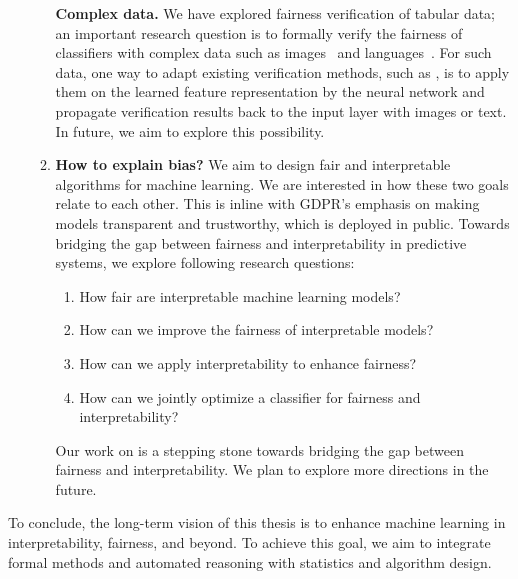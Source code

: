 \begin{itemize}
\begin{enumerate}
		
		\textbf{Complex data.} We have explored fairness verification of tabular data; an important research question is to formally verify the fairness of classifiers with complex data such as images~\cite{nuriel2021permuted} and languages~\cite{abid2021persistent,nadeem2020stereoset,vig2020investigating}. For such data, one way to adapt existing verification methods, such as {\justicia}, is to apply them on the learned feature representation by the neural network and propagate verification results back to the input layer with images or text. In future, we aim to explore this possibility.
	
		\item \textbf{How to explain bias?} We aim to design fair and interpretable algorithms for  machine learning. We are interested in how these two goals relate to each other. This is inline with GDPR's emphasis on making models transparent and trustworthy, which is deployed in public.	Towards bridging the gap between fairness and interpretability in predictive systems, we explore following research questions:
		
		\begin{enumerate}
			\item How fair are interpretable machine learning models? 
			\item How can we improve the fairness of interpretable models?
			\item How can we apply interpretability to enhance fairness?
			\item How can we jointly optimize a classifier for  fairness and interpretability?
		\end{enumerate}
		
		Our work on {\fairXplainer} is a stepping stone towards bridging the gap between fairness and interpretability. We plan to explore more directions in the future.
		
	\end{enumerate}
	
	
	
	
 	
	
\end{itemize}


To conclude, the long-term vision of this thesis is to enhance machine learning in interpretability, fairness, and beyond. To achieve this goal, we aim to integrate formal methods and automated reasoning with statistics and algorithm design.

 

\begin{comment}
	\begin{itemize}
		\item Fairness repair
		\item Incremental solving
		\item Fairness and interpretability as a service to more complex models.
	\end{itemize}
\end{comment}
